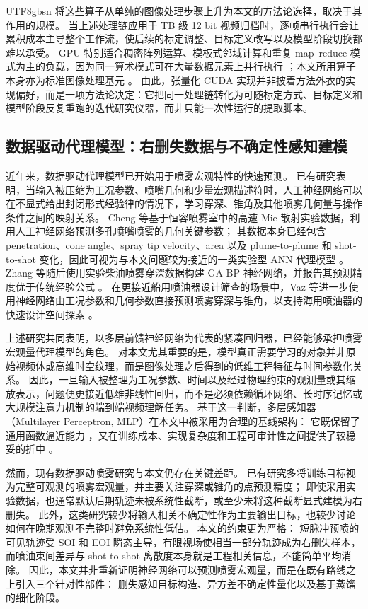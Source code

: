 \documentclass[english, 12pt, a4paper, elec, utf8, a-2b, online]{aaltothesis}
\begin{document}
\begin{CJK*}{UTF8}{gbsn}
将这些算子从单纯的图像处理步骤上升为本文的方法论选择，取决于其作用的规模。
当上述处理链应用于 TB 级 12 bit 视频归档时，逐帧串行执行会让累积成本主导整个工作流，使后续的标定调整、目标定义改写以及模型阶段切换都难以承受。
GPU 特别适合稠密阵列运算、模板式邻域计算和重复 map--reduce 模式为主的负载，因为同一算术模式可在大量数据元素上并行执行 \cite{NickollsBuckGarlandSkadron2008}；本文所用算子本身亦为标准图像处理基元 \cite{GonzalezWoodsDIP,Szeliski2010Vision}。
由此，张量化 CUDA 实现并非披着方法外衣的实现偏好，而是一项方法论决定：它把同一处理链转化为可随标定方式、目标定义和模型阶段反复重跑的迭代研究仪器，而非只能一次性运行的提取脚本。

\subsection{数据驱动代理模型：右删失数据与不确定性感知建模}

近年来，数据驱动代理模型已开始用于喷雾宏观特性的快速预测。
已有研究表明，当输入被压缩为工况参数、喷嘴几何和少量宏观描述符时，人工神经网络可以在不显式给出封闭形式经验律的情况下，学习穿深、锥角及其他喷雾几何量与操作条件之间的映射关系。
Cheng 等基于恒容喷雾室中的高速 Mie 散射实验数据，利用人工神经网络预测多孔喷嘴喷雾的几何关键参数；
其数据本身已经包含 penetration、cone angle、spray tip velocity、area 以及 plume-to-plume 和 shot-to-shot 变化，因此可视为与本文问题较为接近的一类实验型 ANN 代理模型 \cite{ChengAhmadGrahn2023}。
Zhang 等随后使用实验柴油喷雾穿深数据构建 GA-BP 神经网络，并报告其预测精度优于传统经验公式 \cite{ZhangWuXu2024}。
在更接近船用喷油器设计筛查的场景中，Vaz 等进一步使用神经网络由工况参数和几何参数直接预测喷雾穿深与锥角，以支持海用喷油器的快速设计空间探索 \cite{VazKarathanasis2026}。

上述研究共同表明，以多层前馈神经网络为代表的紧凑回归器，已经能够承担喷雾宏观量代理模型的角色。
对本文尤其重要的是，模型真正需要学习的对象并非原始视频体或高维时空纹理，而是图像处理之后得到的低维工程特征与时间参数化关系。
因此，一旦输入被整理为工况参数、时间以及经过物理约束的观测量或其缩放表示，问题便更接近低维非线性回归，而不是必须依赖循环网络、长时序记忆或大规模注意力机制的端到端视频理解任务。
基于这一判断，多层感知器（Multilayer Perceptron, MLP）在本文中被采用为合理的基线架构：
它既保留了通用函数逼近能力 \cite{Hornik1989UAT}，又在训练成本、实现复杂度和工程可审计性之间提供了较稳妥的折中 \cite{BishopPRML2006}。

然而，现有数据驱动喷雾研究与本文仍存在关键差距。
已有研究多将训练目标视为完整可观测的喷雾宏观量，并主要关注穿深或锥角的点预测精度；
即使采用实验数据，也通常默认后期轨迹未被系统性截断，或至少未将这种截断显式建模为右删失。
此外，这类研究较少将输入相关不确定性作为主要输出目标，也较少讨论如何在晚期观测不完整时避免系统性低估。
本文的约束更为严格：
短脉冲预喷的可见轨迹受 SOI 和 EOI 瞬态主导，有限视场使相当一部分轨迹成为右删失样本，而喷油束间差异与 shot-to-shot 离散度本身就是工程相关信息，不能简单平均消除。
因此，本文并非重新证明神经网络可以预测喷雾宏观量，而是在既有路线之上引入三个针对性部件：
删失感知目标构造、异方差不确定性量化以及基于蒸馏的细化阶段。


\end{CJK*}
\end{document}
